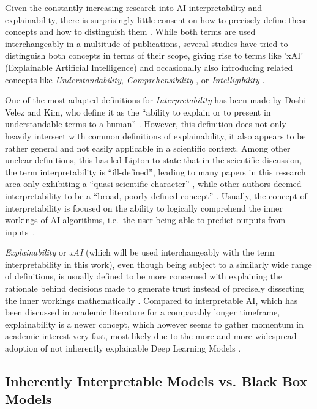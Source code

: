 Given the constantly increasing research into AI interpretability and explainability, there is surprisingly little consent on how to precisely define these concepts and how to distinguish them \parencite{Linardatos2021}. 
While both terms are used interchangeably in a multitude of publications, several studies have tried to distinguish both concepts in terms of their scope, giving rise to terms like 'xAI' (Explainable Artificial Intelligence) \parencite{Gunning2019} and occasionally also introducing related concepts like \textit{Understandability}, \textit{Comprehensibility} \parencite{Guidotti2018}, or \textit{Intelligibility} \parencite{Caruana2015}.

One of the most adapted definitions for \textit{Interpretability} has been made by Doshi-Velez and Kim, who define it as the “ability to explain or to present in understandable terms to a human” \parencite{DoshiVelez2017}. 
However, this definition does not only heavily intersect with common definitions of explainability, it also appears to be rather general and not easily applicable in a scientific context. 
Among other unclear definitions, this has led Lipton to state that in the scientific discussion, the term interpretability is “ill-defined”, leading to many papers in this research area only exhibiting a “quasi-scientific character” \parencite{Lipton2018}, while other authors deemed interpretability to be a “broad, poorly defined concept” \parencite{Murdoch2019}. 
Usually, the concept of interpretability is focused on the ability to logically comprehend the inner workings of AI algorithms, i.e.\ the user being able to predict outputs from inputs~\parencite{Kim2016}.

\textit{Explainability} or \textit{xAI} (which will be used interchangeably with the term interpretability in this work), even though being subject to a similarly wide range of definitions, is usually defined to be more concerned with explaining the rationale behind decisions made to generate trust instead of precisely dissecting the inner workings mathematically \parencite{Gunning2019}. 
Compared to interpretable AI, which has been discussed in academic literature for a comparably longer timeframe, explainability is a newer concept, which however seems to gather momentum in academic interest very fast, most likely due to the more and more widespread adoption of not inherently explainable Deep Learning Models \parencite{BarredoArrieta2020}.


\subsection{Inherently Interpretable Models vs. Black Box Models}\label{subsec:inherently}

